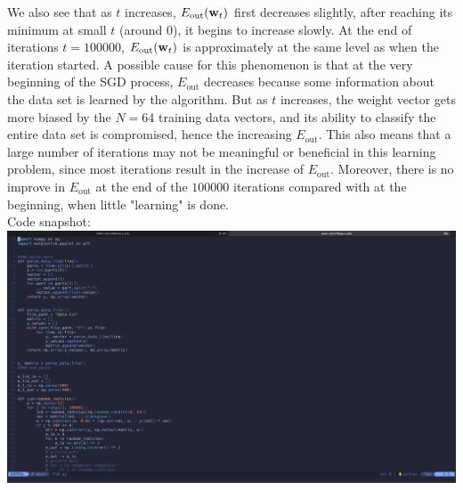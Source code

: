 \documentclass[11pt]{article}
\theoremstyle{definition}
\begin{document}
We also see that as $t$ increases, $E_{\text{out}}(\vb{w}_t)$ first decreases slightly, after reaching its minimum at small $t$ (around 0), it begins to increase slowly. At the end of iterations $t = 100000$, $E_{\text{out}}(\vb{w}_t)$ is approximately at the same level as when the iteration started. A possible cause for this phenomenon is that at the very beginning of the SGD process, $E_{\text{out}}$ decreases because some information about the data set is learned by the algorithm. But as $t$ increases, the weight vector gets more biased by the $N = 64$ training data vectors, and its ability to classify the entire data set is compromised, hence the increasing $E_{\text{out}}$. This also means that a large number of iterations may not be meaningful or beneficial in this learning problem, since most iterations result in the increase of $E_\text{out}$. Moreover, there is no improve in $E_\text{out}$ at the end of the $100000$ iterations compared with at the beginning, when little "learning" is done. \\ 
Code snapshot: \\ 
\includegraphics[width = \textwidth]{P10snap.png} \\
\newpage
\end{document}
